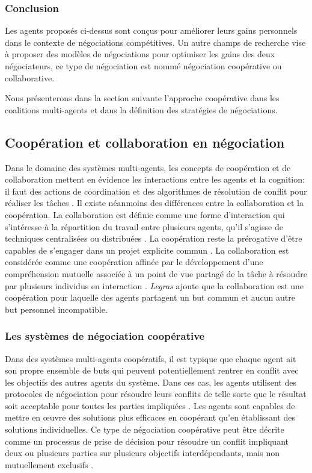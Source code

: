 	\subsubsection{Conclusion}		
	Les agents proposés ci-dessus sont conçus pour améliorer leurs gains personnels dans le contexte de négociations compétitives. Un autre champs de recherche vise à proposer des modèles de négociations pour optimiser les gains des deux négociateurs, ce type de négociation est nommé négociation coopérative ou collaborative. 
	
	Nous présenterons dans la section suivante l'approche coopérative dans les coalitions multi-agents et dans la définition des stratégies de négociations. 
	
		\subsection{Coopération et collaboration en négociation}
		
		Dans le domaine des systèmes multi-agents, les concepts de coopération et de collaboration mettent en évidence les interactions entre les agents et la cognition: il faut des actions de coordination et des algorithmes de résolution de conflit pour réaliser les tâches \cite{jennings1995controlling}. Il existe néanmoins des différences entre la collaboration et la coopération.
		La collaboration est définie comme une forme d'interaction qui s'intéresse à la répartition du travail entre plusieurs agents, qu'il s'agisse de techniques centralisées ou distribuées \cite{ferber1997systemes}. La coopération reste la prérogative d'être capables de s'engager dans un projet explicite commun \cite{lucien2016multiagent}.
		La collaboration est considérée comme une coopération affinée par le développement d'une compréhension mutuelle associée à un point de vue partagé de la tâche à résoudre par plusieurs individus en interaction \cite{weiss1999multiagent,blanquet2007web}. \emph{Legras} \cite{legrascooperation} ajoute que la collaboration est une coopération pour laquelle des agents partagent un but commun et aucun autre but personnel incompatible. 
		
		\subsubsection{Les systèmes de négociation coopérative}
		
		Dans des systèmes multi-agents coopératifs, il est typique que chaque agent ait son propre ensemble de buts qui peuvent potentiellement rentrer en conflit avec les objectifs des autres agents du système.
		 Dans ces cas, les agents utilisent des protocoles de négociation pour résoudre leurs conflits de telle sorte que le résultat soit acceptable pour toutes les parties impliquées \cite{wollkind2004automated}. Les agents sont capables de mettre en œuvre des solutions plus efficaces en coopérant qu'en établissant des solutions individuelles. Ce type de négociation coopérative peut être décrite comme un processus de prise de décision pour résoudre un conflit impliquant deux ou plusieurs parties sur plusieurs objectifs interdépendants, mais non mutuellement exclusifs \cite{lewicki2011essentials}. 
	

